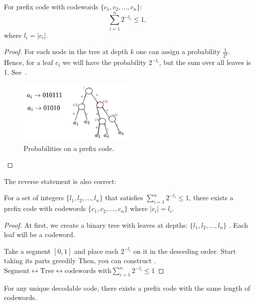 \begin{theorem} 
    For prefix code with codewords $\{ c_{1}, c_{2}, \dots, c_{n} \}$:
    \[\sum_{i = 1}^{n}2^{-l_{i}} \le 1,\]
    where $l_i = |c_i|$.
\end{theorem}
\begin{proof}
    For each node in the tree at depth $k$ one can assign a probability $\frac{1}{2^{k}}$.
    Hence, for a leaf $c_i$ we will have the probability $2^{-l_i}$, but the sum over all leaves is 1.
    See~.
    \begin{figure}[H]
        \centering
        \includegraphics[width=0.5\textwidth]{figures/image_2024-10-23_22-13-28}
        \caption{Probabilities on a prefix code.}
        \label{fig:image_2024-10-23_22-13-28}
    \end{figure}
\end{proof}

The reverse statement is also correct:
\begin{theorem}
    For a set of integers $\{ l_{1}, l_{2}, \dots, l_{n} \}$ that satisfies $\sum _{ i = 1 }^{ n } 2^{-l_{i}} \le 1$, there exists a prefix code with codewords $\{ c_{1}, c_{2}, \dots, c_{n} \}$ where $|c_{i}| = l_{i}$.
\end{theorem}
\begin{proof}
    At first, we create a binary tree with leaves at depths: $\{ l_{1}, l_{2}, \dots, l_{n} \}$ .
    Each leaf will be a codeword.

    Take a segment $[0, 1]$ and place each $2^{-l_i}$ on it in the desceding order.
    Start taking its parts greedily
    Then, you can construct . 
    $\text{Segment} \longleftrightarrow \text{Tree} \longleftrightarrow \text{codewords with} \sum _{ i = 1 }^{ n } 2^{-l_i} \le 1$
\end{proof}

\begin{corollary}
    For any unique decodable code, there exists a prefix code with the same length of codewords.
\end{corollary}

